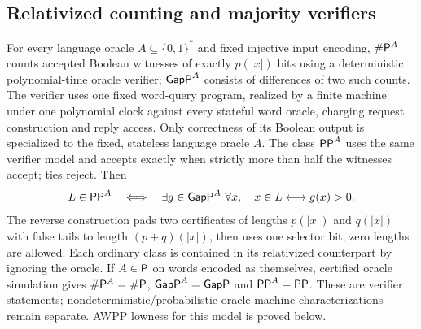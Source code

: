 \begin{result}
\subsection{Relativized counting and majority verifiers}
For every language oracle $A\subseteq\{0,1\}^*$ and fixed injective input encoding,
$\#\mathsf{P}^A$ counts accepted Boolean witnesses of exactly $p(|x|)$ bits using a deterministic
polynomial-time oracle verifier; $\mathsf{GapP}^A$ consists of differences of two such counts.
The verifier uses one fixed word-query program, realized by a finite machine under one
polynomial clock against every stateful word oracle, charging request construction and
reply access. Only correctness of its Boolean output is specialized to the fixed,
stateless language oracle $A$. The class $\mathsf{PP}^A$ uses the same verifier model and
accepts exactly when strictly more than half the witnesses accept; ties reject. Then
\[
 L\in\mathsf{PP}^A\quad\Longleftrightarrow\quad
 \exists g\in\mathsf{GapP}^A\ \forall x,\quad x\in L\longleftrightarrow g(x)>0.
\]
The reverse construction pads two certificates of lengths $p(|x|)$ and $q(|x|)$ with
false tails to length $(p+q)(|x|)$, then uses one selector bit; zero lengths are allowed.
Each ordinary class is contained in its relativized counterpart by ignoring the oracle.
If $A\in\mathsf{P}$ on words encoded as themselves, certified oracle simulation gives
$\#\mathsf{P}^A=\#\mathsf{P}$, $\mathsf{GapP}^A=\mathsf{GapP}$ and $\mathsf{PP}^A=\mathsf{PP}$.
These are verifier statements; nondeterministic/probabilistic oracle-machine
characterizations remain separate. AWPP lowness for this model is proved below.
\citep{FennerFortnowKurtz1994,Fortnow1997,AroraBarak09}
\end{result}


